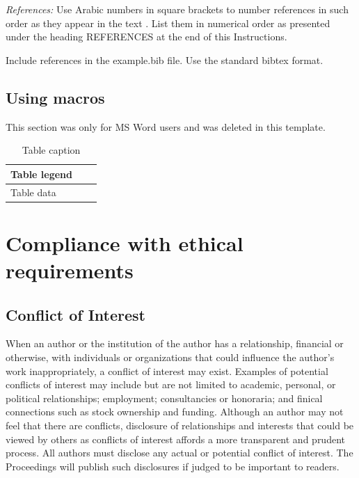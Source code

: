 \documentclass[nouppercase]{ifmbe}
\begin{document}
\textit{References:} Use Arabic numbers in square brackets to number
references in such order as they appear in the text . List them in
numerical order as presented under the heading REFERENCES at the end of
this Instructions.

Include references in the example.bib file. Use the standard bibtex
format.

\subsection{Using macros}

This section was only for MS Word users and was deleted in this template.

\begin{table}[h]
        \footnotesize  \onehalfspacing
        \caption{Table caption}
        \begin{tabular}{p{2.40cm}p{2.40cm}p{2.40cm}}
                \hline
                Table legend &  &  \\
                \hline
                Table data & &\\
                \hline
        \end{tabular}
        \label{table2}
\end{table}

\section{Compliance with ethical requirements}

\subsection{Conflict of Interest}
When an author or the institution of the author has a relationship, financial or otherwise, with individuals or organizations that could influence the author’s work inappropriately, a conflict of interest may exist. Examples of potential conflicts of interest may include but are not limited to academic, personal, or political relationships; employment; consultancies or honoraria; and finical connections such as stock ownership and funding. Although an author may not feel that there are conflicts, disclosure of relationships and interests that could be viewed by others as conflicts of interest affords a more transparent and prudent process. All authors must disclose any actual or potential conflict of interest. The Proceedings will publish such disclosures if judged to be important to readers.
\end{document}
